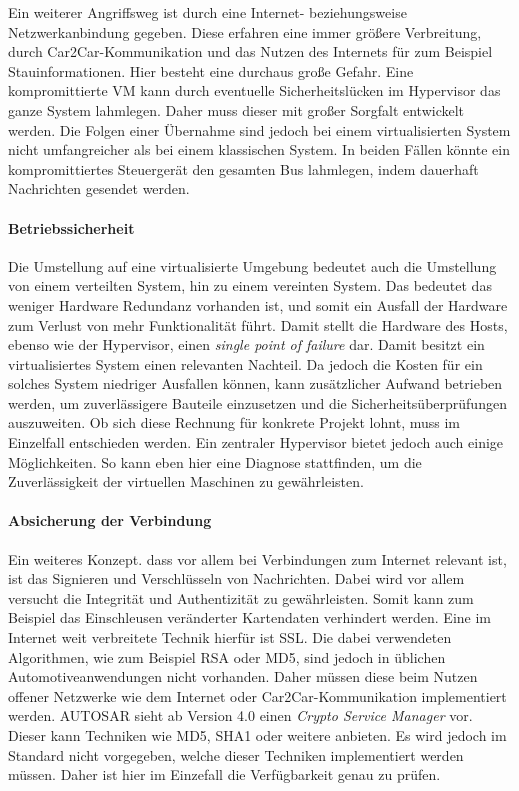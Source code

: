 \documentclass[
  a4paper,					    %
  twoside,
  DIV=calc,     				%
  bibliography=totoc,
  cleardoublepage=empty,
  ngerman,     					%
  final       					%
]{scrbook}
\begin{document}
Ein weiterer Angriffsweg ist durch eine Internet- beziehungsweise Netzwerkanbindung gegeben. Diese erfahren eine immer größere Verbreitung, durch Car2Car-Kommunikation und das Nutzen des Internets für zum Beispiel Stauinformationen. Hier besteht eine durchaus große Gefahr. Eine kompromittierte VM kann durch eventuelle Sicherheitslücken im Hypervisor das ganze System lahmlegen. Daher muss dieser mit großer Sorgfalt entwickelt werden. Die Folgen einer Übernahme sind jedoch bei einem virtualisierten System nicht umfangreicher als bei einem klassischen System. In beiden Fällen könnte ein kompromittiertes Steuergerät den gesamten Bus lahmlegen, indem dauerhaft Nachrichten gesendet werden.

\paragraph{Betriebssicherheit}
Die Umstellung auf eine virtualisierte Umgebung bedeutet auch die Umstellung von einem verteilten System, hin zu einem vereinten System. Das bedeutet das weniger Hardware Redundanz vorhanden ist, und somit ein Ausfall der Hardware zum Verlust von mehr Funktionalität führt. Damit stellt die Hardware des Hosts, ebenso wie der Hypervisor, einen \emph{single point of failure} dar. Damit besitzt ein virtualisiertes System einen relevanten Nachteil. Da jedoch die Kosten für ein solches System niedriger Ausfallen können, kann zusätzlicher Aufwand betrieben werden, um zuverlässigere Bauteile einzusetzen und die Sicherheitsüberprüfungen auszuweiten. Ob sich diese Rechnung für konkrete Projekt lohnt, muss im Einzelfall entschieden werden. Ein zentraler Hypervisor bietet jedoch auch einige Möglichkeiten. So kann eben hier eine Diagnose stattfinden, um die Zuverlässigkeit der virtuellen Maschinen zu gewährleisten. 


\paragraph{Absicherung der Verbindung}
Ein weiteres Konzept. dass vor allem bei Verbindungen zum Internet relevant ist, ist das Signieren und Verschlüsseln von Nachrichten. Dabei wird vor allem versucht die Integrität und Authentizität zu gewährleisten. Somit kann zum Beispiel das Einschleusen veränderter Kartendaten verhindert werden. Eine im Internet weit verbreitete Technik hierfür ist SSL. Die dabei verwendeten Algorithmen, wie zum Beispiel RSA oder MD5, sind jedoch in üblichen Automotiveanwendungen nicht vorhanden. Daher müssen diese beim Nutzen offener Netzwerke wie dem Internet oder Car2Car-Kommunikation implementiert werden. AUTOSAR sieht ab Version 4.0 einen \emph{Crypto Service Manager} vor. Dieser kann Techniken wie MD5, SHA1 oder weitere anbieten. Es wird jedoch im Standard nicht vorgegeben, welche dieser Techniken implementiert werden müssen. Daher ist hier im Einzefall die Verfügbarkeit genau zu prüfen.
\end{document}
